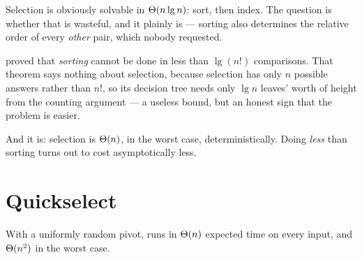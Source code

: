 \begin{conceptbox}
Selection is obviously solvable in $\Theta(n\operatorname{lg} n)$: sort, then index. The
question is whether that is wasteful, and it plainly is --- sorting also
determines the relative order of every \emph{other} pair, which nobody
requested.

\smallskip
{} proved that \emph{sorting} cannot be done in less than
$\lg(n!)$ comparisons. That theorem says nothing about selection, because
selection has only $n$ possible answers rather than $n!$, so its decision tree
needs only $\lg n$ leaves' worth of height from the counting argument --- a
useless bound, but an honest sign that the problem is easier.

\smallskip
And it is: selection is $\Theta(n)$, in the worst case, deterministically.
Doing \emph{less} than sorting turns out to cost asymptotically less.
\end{conceptbox}

\section{Quickselect}


\begin{theorem}\label{thm:qsel}
With a uniformly random pivot,  runs in $\Theta(n)$
expected time on every input, and $\Theta(n^{2})$ in the worst case.
\end{theorem}

